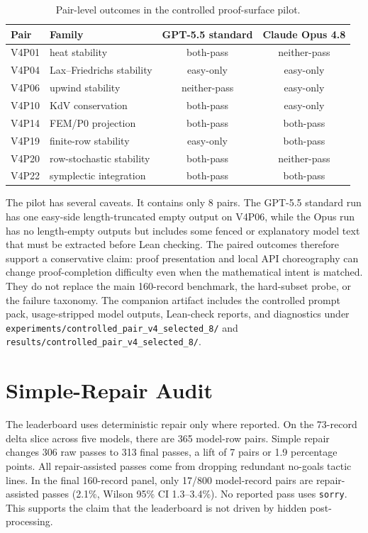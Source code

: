 \begin{table}[htbp]
\centering
\caption{Pair-level outcomes in the controlled proof-surface pilot.}
\label{tab:supp-controlled-pair-pairs}
\small
\begin{tabular}{llcc}
\toprule
Pair & Family & GPT-5.5 standard & Claude Opus 4.8\\
\midrule
V4P01 & heat stability & both-pass & neither-pass\\
V4P04 & Lax--Friedrichs stability & easy-only & easy-only\\
V4P06 & upwind stability & neither-pass & easy-only\\
V4P10 & KdV conservation & both-pass & easy-only\\
V4P14 & FEM/P0 projection & both-pass & both-pass\\
V4P19 & finite-row stability & easy-only & both-pass\\
V4P20 & row-stochastic stability & both-pass & neither-pass\\
V4P22 & symplectic integration & both-pass & both-pass\\
\bottomrule
\end{tabular}
\end{table}

The pilot has several caveats. It contains only 8 pairs. The GPT-5.5 standard
run has one easy-side length-truncated empty output on V4P06, while the Opus
run has no length-empty outputs but includes some fenced or explanatory model
text that must be extracted before Lean checking. The paired outcomes therefore
support a conservative claim: proof presentation and local API choreography can
change proof-completion difficulty even when the mathematical intent is
matched. They do not replace the main 160-record benchmark, the hard-subset
probe, or the failure taxonomy. The companion artifact includes the controlled
prompt pack, usage-stripped model outputs, Lean-check reports, and diagnostics under
\texttt{experiments/controlled\_pair\_v4\_selected\_8/} and
\texttt{results/controlled\_pair\_v4\_selected\_8/}.

\section{Simple-Repair Audit}

The leaderboard uses deterministic repair only where reported. On the
73-record delta slice across five models, there are 365 model-row pairs. Simple
repair changes 306 raw passes to 313 final passes, a lift of 7 pairs or 1.9
percentage points. All repair-assisted passes come from dropping redundant
no-goals tactic lines. In the final 160-record panel, only 17/800
model-record pairs are repair-assisted passes (2.1\%, Wilson 95\% CI
1.3--3.4\%). No reported pass uses \texttt{sorry}. This supports the claim
that the leaderboard is not driven by hidden post-processing.

